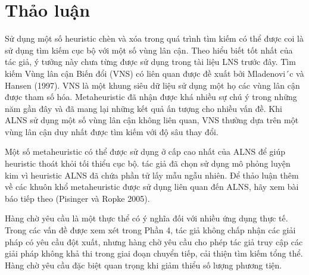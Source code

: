 \section{Thảo luận}
Sử dụng một số heuristic chèn và xóa trong quá trình tìm kiếm có thể được coi là sử dụng tìm kiếm cục bộ với một số vùng lân cận. Theo hiểu biết tốt nhất của tác giả, ý tưởng này chưa từng được sử dụng trong tài liệu LNS trước đây. Tìm kiếm Vùng lân cận Biến đổi (VNS) có liên quan được đề xuất bởi Mladenovi´c và Hansen (1997). VNS là một khung siêu dữ liệu sử dụng một họ các vùng lân cận được tham số hóa. Metaheuristic đã nhận được khá nhiều sự chú ý trong những năm gần đây và đã mang lại những kết quả ấn tượng cho nhiều vấn đề. Khi ALNS sử dụng một số vùng lân cận không liên quan, VNS thường dựa trên một vùng lân cận duy nhất được tìm kiếm với độ sâu thay đổi.

Một số metaheuristic có thể được sử dụng ở cấp cao nhất của ALNS để giúp heuristic thoát khỏi tối thiểu cục bộ. tác giả đã chọn sử dụng mô phỏng luyện kim vì heuristic ALNS đã chứa phần tử lấy mẫu ngẫu nhiên. Để thảo luận thêm về các khuôn khổ metaheuristic được sử dụng liên quan đến ALNS, hãy xem bài báo tiếp theo (Pisinger và Ropke 2005).

Hàng chờ yêu cầu là một thực thể có ý nghĩa đối với nhiều ứng dụng thực tế. Trong các vấn đề được xem xét trong Phần 4, tác giả không chấp nhận các giải pháp có yêu cầu đột xuất, nhưng hàng chờ yêu cầu cho phép tác giả truy cập các giải pháp không khả thi trong giai đoạn chuyển tiếp, cải thiện tìm kiếm tổng thể. Hàng chờ yêu cầu đặc biệt quan trọng khi giảm thiểu số lượng phương tiện.
